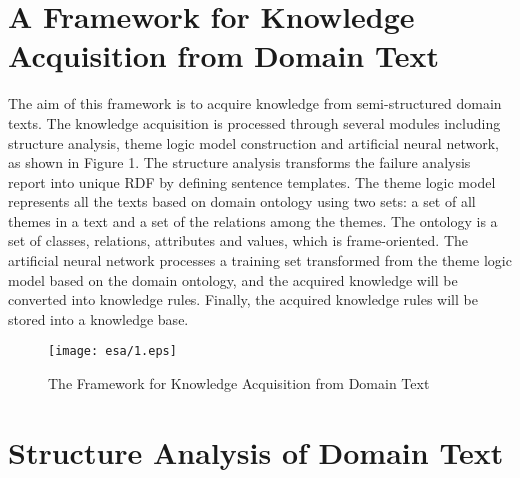 \documentclass{elsarticle}
\begin{document}
\section{A Framework for Knowledge Acquisition from Domain Text
}
\label{sec:fram-knowl-acqu}

The aim of this framework is to acquire knowledge from semi-structured
domain texts. The knowledge acquisition is processed through several
modules including structure analysis, theme logic model construction
and artificial neural network, as shown in Figure 1. The structure
analysis transforms the failure analysis report into unique RDF by
defining sentence templates. The theme logic model represents all the
texts based on domain ontology using two sets: a set of all themes in
a text and a set of the relations among the themes. The ontology is a set of classes, relations, attributes and
values, which is frame-oriented. The artificial neural network processes a training set
transformed from the theme logic model based on the domain ontology,
and the acquired knowledge will be converted into knowledge rules. Finally, the acquired knowledge rules will be
stored into a knowledge base.
\begin{figure}[htp]
  \centering
  \texttt{[image: esa/1.eps]}

  \caption{The Framework for Knowledge Acquisition from Domain Text}
  \label{fig:1}
\end{figure}

\section{Structure Analysis of Domain Text 
}
\label{sec:struct-analys-doma}
\end{document}
